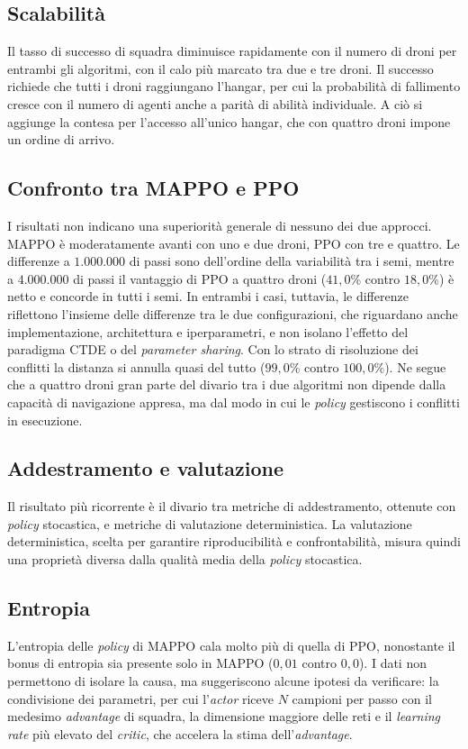 \documentclass[12pt,a4paper,twoside]{report}
\begin{document}
\subsection{Scalabilità}
Il tasso di successo di squadra diminuisce rapidamente con il numero di droni per entrambi gli algoritmi, con il calo più marcato tra due e tre droni. Il successo richiede che tutti i droni raggiungano l'hangar, per cui la probabilità di fallimento cresce con il numero di agenti anche a parità di abilità individuale. A ciò si aggiunge la contesa per l'accesso all'unico hangar, che con quattro droni impone un ordine di arrivo.

\subsection{Confronto tra MAPPO e PPO}
I risultati non indicano una superiorità generale di nessuno dei due approcci. MAPPO è moderatamente avanti con uno e due droni, PPO con tre e quattro. Le differenze a $1.000.000$ di passi sono dell'ordine della variabilità tra i semi, mentre a $4.000.000$ di passi il vantaggio di PPO a quattro droni ($41,0\%$ contro $18,0\%$) è netto e concorde in tutti i semi. In entrambi i casi, tuttavia, le differenze riflettono l'insieme delle differenze tra le due configurazioni, che riguardano anche implementazione, architettura e iperparametri, e non isolano l'effetto del paradigma CTDE o del \emph{parameter sharing}. Con lo strato di risoluzione dei conflitti la distanza si annulla quasi del tutto ($99,0\%$ contro $100,0\%$). Ne segue che a quattro droni gran parte del divario tra i due algoritmi non dipende dalla capacità di navigazione appresa, ma dal modo in cui le \emph{policy} gestiscono i conflitti in esecuzione.

\subsection{Addestramento e valutazione}
Il risultato più ricorrente è il divario tra metriche di addestramento, ottenute con \emph{policy} stocastica, e metriche di valutazione deterministica. La valutazione deterministica, scelta per garantire riproducibilità e confrontabilità, misura quindi una proprietà diversa dalla qualità media della \emph{policy} stocastica.

\subsection{Entropia}
L'entropia delle \emph{policy} di MAPPO cala molto più di quella di PPO, nonostante il bonus di entropia sia presente solo in MAPPO ($0,01$ contro $0,0$). I dati non permettono di isolare la causa, ma suggeriscono alcune ipotesi da verificare: la condivisione dei parametri, per cui l'\emph{actor} riceve $N$ campioni per passo con il medesimo \emph{advantage} di squadra, la dimensione maggiore delle reti e il \emph{learning rate} più elevato del \emph{critic}, che accelera la stima dell'\emph{advantage}.
\end{document}
